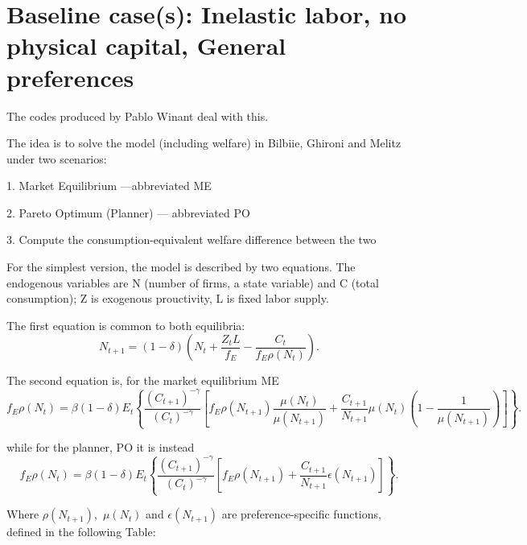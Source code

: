 \documentclass{article}
\begin{document}
\section{Baseline case(s): Inelastic labor, no physical capital, General
preferences}

The codes produced by Pablo Winant deal with this.

The idea is to solve the model (including welfare) in Bilbiie, Ghironi and
Melitz under two scenarios:

1. Market Equilibrium ---abbreviated ME

2. Pareto Optimum (Planner) --- abbreviated PO

3. Compute the consumption-equivalent welfare difference between the two

For the simplest version, the model is described by two equations. The
endogenous variables are N (number of firms, a state variable) and C (total
consumption); Z is exogenous prouctivity, L is fixed labor supply.

The first equation is common to both equilibria:%
\begin{equation}
N_{t+1}=\left( 1-\delta \right) \left( N_{t}+\frac{Z_{t}L}{f_{E}}-\frac{C_{t}%
}{f_{E}\rho \left( N_{t}\right) }\right) .  \label{Neq}
\end{equation}

The second equation is, for the market equilibrium ME%
\begin{equation}
f_{E}\rho \left( N_{t}\right) =\beta \left( 1-\delta \right) E_{t}\left\{ 
\frac{\left( C_{t+1}\right) ^{-\gamma }}{\left( C_{t}\right) ^{-\gamma }}%
\left[ f_{E}\rho \left( N_{t+1}\right) \frac{\mu \left( N_{t}\right) }{\mu
\left( N_{t+1}\right) }+\frac{C_{t+1}}{N_{t+1}}\mu \left( N_{t}\right)
\left( 1-\frac{1}{\mu \left( N_{t+1}\right) }\right) \right] \right\} .
\label{eulerCE}
\end{equation}

while for the planner, PO it is instead%
\begin{equation}
f_{E}\rho \left( N_{t}\right) =\beta \left( 1-\delta \right) E_{t}\left\{ 
\frac{\left( C_{t+1}\right) ^{-\gamma }}{\left( C_{t}\right) ^{-\gamma }}%
\left[ f_{E}\rho \left( N_{t+1}\right) +\frac{C_{t+1}}{N_{t+1}}\epsilon
\left( N_{t+1}\right) \right] \right\} .  \label{EulerPlanner}
\end{equation}

Where $\rho \left( N_{t+1}\right) ,$ $\mu \left( N_{t}\right) $ and $%
\epsilon \left( N_{t+1}\right) $ are preference-specific functions, defined
in the following Table:
\end{document}
